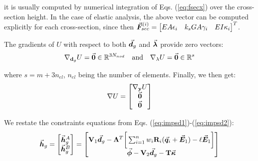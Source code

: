 \begin{appendices}
\noindent it is usually computed by numerical integration of Eqs.
(\ref{eq:fsecx}) over the cross-section height. In the case of elastic
analysis, the above vector can be computed explicitly for each cross-section,
since then $\vec{\bm{F}}_{sec}^{(i)} = \begin{bmatrix}
	EA\epsilon_i & k_sGA\gamma_i & EI\kappa_i
\end{bmatrix}^T$.

The gradients of $U$ with respect to both $\vec{\bm{d}}_g$ and $\vec{\bm{\lambda}}$
provide zero vectors:
\begin{gather}
	\nabla_{\mathbf{d}_g}U = 
	\vec{\bm{0}}\in\mathbb{R}^{3N_{nod}}\quad\text{and}\quad
	\nabla_{\mathbf{\lambda}}U = \vec{\bm{0}}\in\mathbb{R}^{s}\nonumber
\end{gather}

\noindent where $s=m + 3n_{el}$, $n_{el}$ being the number of elements.
Finally, we then get:
\begin{gather}
	\nabla U = \begin{bmatrix}
		\nabla_{\mathbf{y}}U\\ \vec{\bm{0}}\\ \vec{\bm{0}}
	\end{bmatrix}
\end{gather}


We restate the constraints equations from Eqs.
(\ref{eq:impsd1})-(\ref{eq:impsd2}):
\begin{gather}
	\vec{\bm{h}}_g = \begin{bmatrix}
		\vec{\bm{h}}_g^A\\ \vec{\bm{h}}_g^B
	\end{bmatrix} =
	\begin{bmatrix}
		\mathbf{V}_1\vec{\bm{d}}_g - \mathbf{\Lambda}^T\bigg[\sum_{i=1}^n
		w_i\mathbf{R}_i(\vec{\bm{q}}_i+\vec{\bm{E}}_1) - \ell\vec{\bm{E}}_1\bigg]\\
		\vec{\bm{\phi}}-\mathbf{V}_2\vec{\bm{d}}_g - \mathbf{T}\vec{\bm{\kappa}}
	\end{bmatrix}\nonumber
\end{gather}


\end{appendices}
